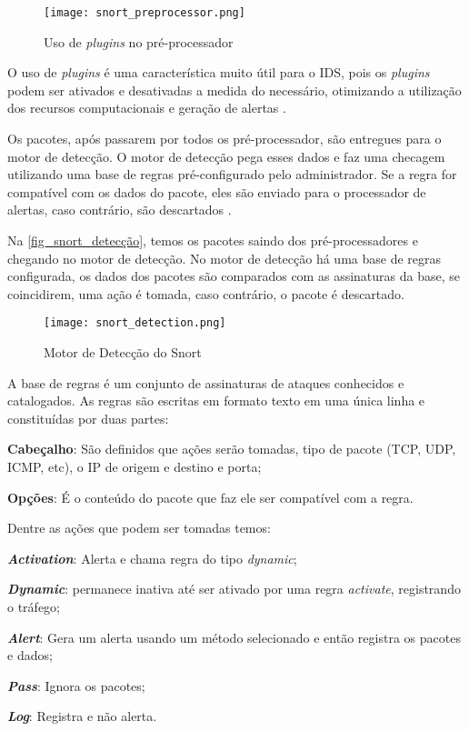 \begin{figure}[!htb]
  \centering
  \caption{Uso de \textit{plugins} no pré-processador} \label{fig_snort_preprocessor}
  \texttt{[image: snort\_preprocessor.png]}
\end{figure}

O uso de \textit{plugins} é uma característica muito útil para o IDS, pois os \textit{plugins} podem ser ativados e desativadas a medida do necessário, otimizando a utilização dos recursos computacionais e geração de alertas \cite{snort:andrew}.

Os pacotes, após passarem por todos os pré-processador, são entregues para o motor de detecção. O motor de detecção pega esses dados e faz uma checagem utilizando uma base de regras pré-configurado pelo administrador. Se a regra for compatível com os dados do pacote, eles são enviado para o processador de alertas, caso contrário, são descartados \cite{snort:andrew}.

Na \autoref{fig_snort_detecção}, temos os pacotes saindo dos pré-processadores e chegando no motor de detecção. No motor de detecção há uma base de regras configurada, os dados dos pacotes são comparados com as assinaturas da base, se coincidirem, uma ação é tomada, caso contrário, o pacote é descartado.

\begin{figure}[!htb]
  \centering
  \caption{Motor de Detecção do Snort} \label{fig_snort_detecção}
  \texttt{[image: snort\_detection.png]}
\end{figure}

A base de regras é um conjunto de assinaturas de ataques conhecidos e catalogados. As regras são escritas em formato texto em uma única linha e constituídas por duas partes: 

\begin{alineas}
\item \textbf{Cabeçalho}: São definidos que ações serão tomadas, tipo de pacote (TCP, UDP, ICMP, etc), o IP de origem e destino e porta;
\item \textbf{Opções}: É o conteúdo do pacote que faz ele ser compatível com a regra.
\end{alineas}

Dentre as ações que podem ser tomadas temos:

\begin{alineas}
\item \textbf{\textit{Activation}}: Alerta e chama regra do tipo \textit{dynamic};
\item \textbf{\textit{Dynamic}}: permanece inativa até ser ativado por uma regra \textit{activate}, registrando o tráfego;
\item \textbf{\textit{Alert}}: Gera um alerta usando um método selecionado e então registra os pacotes e dados;
\item \textbf{\textit{Pass}}: Ignora os pacotes;
\item \textbf{\textit{Log}}: Registra e não alerta.
\end{alineas}

